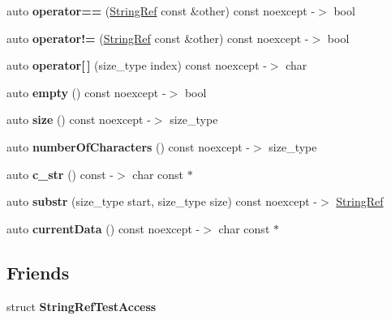 \begin{DoxyCompactItemize}
auto {\bfseries operator==} (\hyperlink{classCatch_1_1StringRef}{String\+Ref} const \&other) const noexcept -\/$>$ bool
\item 
\mbox{\label{classCatch_1_1StringRef_aaa6c8bf61c4628034c19763d1c8ad215}} 
auto {\bfseries operator!=} (\hyperlink{classCatch_1_1StringRef}{String\+Ref} const \&other) const noexcept -\/$>$ bool
\item 
\mbox{\label{classCatch_1_1StringRef_a4ba2e01eec1f0f56c257d213c796ab3b}} 
auto {\bfseries operator\mbox{[}$\,$\mbox{]}} (size\+\_\+type index) const noexcept -\/$>$ char
\item 
\mbox{\label{classCatch_1_1StringRef_ac6b68b9dc1e1dec69e884e3f7be581bd}} 
auto {\bfseries empty} () const noexcept -\/$>$ bool
\item 
\mbox{\label{classCatch_1_1StringRef_ae084d72cb2952cee61a63ef36611d0ad}} 
auto {\bfseries size} () const noexcept -\/$>$ size\+\_\+type
\item 
\mbox{\label{classCatch_1_1StringRef_a6a6cac7430e626ffdd7550a081e8168f}} 
auto {\bfseries number\+Of\+Characters} () const noexcept -\/$>$ size\+\_\+type
\item 
\mbox{\label{classCatch_1_1StringRef_a1669cb2765e820ca258159676cbd82a5}} 
auto {\bfseries c\+\_\+str} () const -\/$>$ char const $\ast$
\item 
\mbox{\label{classCatch_1_1StringRef_a248568b467cf6599320903ae613c8eee}} 
auto {\bfseries substr} (size\+\_\+type start, size\+\_\+type size) const noexcept -\/$>$ \hyperlink{classCatch_1_1StringRef}{String\+Ref}
\item 
\mbox{\label{classCatch_1_1StringRef_aee240387305ca8b249169d79f36e7002}} 
auto {\bfseries current\+Data} () const noexcept -\/$>$ char const $\ast$
\end{DoxyCompactItemize}
\subsection*{Friends}
\begin{DoxyCompactItemize}
\item 
\mbox{\label{classCatch_1_1StringRef_a420e64e1652de1b0d427775781b018f5}} 
struct {\bfseries String\+Ref\+Test\+Access}
\end{DoxyCompactItemize}


